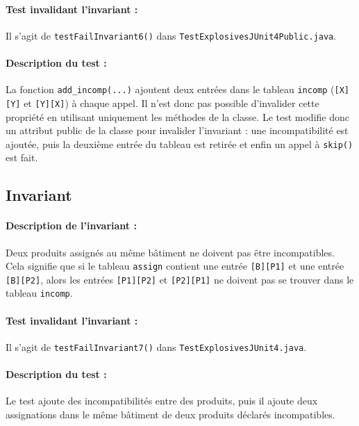 \documentclass{article}
\begin{document}
\vspace{-0.2cm}
\paragraph{Test invalidant l'invariant :} Il s'agit de \texttt{testFailInvariant6()} dans \texttt{TestExplosivesJUnit4Public.java}.

\vspace{-0.2cm}
\paragraph{Description du test :} La fonction \texttt{add\_incomp(...)} ajoutent deux entrées dans le tableau \texttt{incomp} (\texttt{[X][Y]} et \texttt{[Y][X]}) à chaque appel. Il n'est donc pas possible d'invalider cette propriété en utilisant uniquement les méthodes de la classe. Le test modifie donc un attribut public de la classe pour invalider l'invariant : une incompatibilité est ajoutée, puis la deuxième entrée du tableau est retirée et enfin un appel à \texttt{skip()} est fait.

\subsection{Invariant }

\paragraph{Description de l'invariant :} Deux produits assignés au même bâtiment ne doivent pas être incompatibles. Cela signifie que si le tableau \texttt{assign} contient une entrée \texttt{[B][P1]} et une entrée \texttt{[B][P2]}, alors les entrées \texttt{[P1][P2]} et \texttt{[P2][P1]} ne doivent pas se trouver dans le tableau \texttt{incomp}.

\vspace{-0.2cm}
\paragraph{Test invalidant l'invariant :} Il s'agit de \texttt{testFailInvariant7()} dans \texttt{TestExplosivesJUnit4.java}.

\vspace{-0.2cm}
\paragraph{Description du test :} Le test ajoute des incompatibilités entre des produits, puis il ajoute deux assignations dans le même bâtiment de deux produits déclarés incompatibles.
\end{document}
